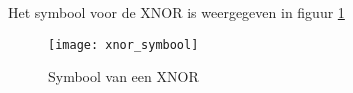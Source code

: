 Het symbool voor de XNOR is weergegeven in figuur \ref{symbool:xnor}

\begin{figure}[h]
\texttt{[image: xnor\_symbool]}
\centering
\caption{Symbool van een XNOR}
\label{symbool:xnor}
\end{figure}

